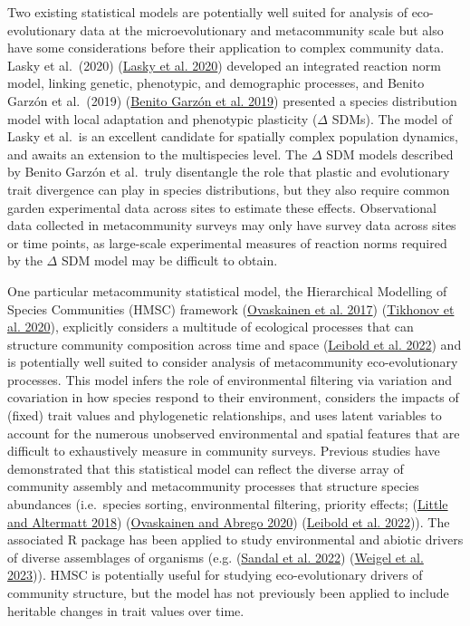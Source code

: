 \documentclass[
]{article}
\begin{document}
Two existing statistical models are potentially well suited for analysis of eco-evolutionary data at the microevolutionary and metacommunity scale but also have some considerations before their application to complex community data. Lasky et al.~(2020) (\protect\hyperlink{ref-Lasky2020}{Lasky et al. 2020}) developed an integrated reaction norm model, linking genetic, phenotypic, and demographic processes, and Benito Garzón et al.~(2019) (\protect\hyperlink{ref-Garzon2019}{Benito Garzón et al. 2019}) presented a species distribution model with local adaptation and phenotypic plasticity (\(\Delta\) SDMs). The model of Lasky et al.~is an excellent candidate for spatially complex population dynamics, and awaits an extension to the multispecies level. The \(\Delta\) SDM models described by Benito Garzón et al.~truly disentangle the role that plastic and evolutionary trait divergence can play in species distributions, but they also require common garden experimental data across sites to estimate these effects. Observational data collected in metacommunity surveys may only have survey data across sites or time points, as large-scale experimental measures of reaction norms required by the \(\Delta\) SDM model may be difficult to obtain.

One particular metacommunity statistical model, the Hierarchical Modelling of Species Communities (HMSC) framework (\protect\hyperlink{ref-Ovaskainen2017HMSC}{Ovaskainen et al. 2017}) (\protect\hyperlink{ref-Tikhonov2020}{Tikhonov et al. 2020}), explicitly considers a multitude of ecological processes that can structure community composition across time and space (\protect\hyperlink{ref-Leibold2022}{Leibold et al. 2022}) and is potentially well suited to consider analysis of metacommunity eco-evolutionary processes. This model infers the role of environmental filtering via variation and covariation in how species respond to their environment, considers the impacts of (fixed) trait values and phylogenetic relationships, and uses latent variables to account for the numerous unobserved environmental and spatial features that are difficult to exhaustively measure in community surveys. Previous studies have demonstrated that this statistical model can reflect the diverse array of community assembly and metacommunity processes that structure species abundances (i.e.~species sorting, environmental filtering, priority effects; (\protect\hyperlink{ref-Little2018}{Little and Altermatt 2018}) (\protect\hyperlink{ref-Ovaskainen2020}{Ovaskainen and Abrego 2020}) (\protect\hyperlink{ref-Leibold2022}{Leibold et al. 2022})). The associated R package has been applied to study environmental and abiotic drivers of diverse assemblages of organisms (e.g. (\protect\hyperlink{ref-Sandal2022}{Sandal et al. 2022}) (\protect\hyperlink{ref-Weigel2023}{Weigel et al. 2023})). HMSC is potentially useful for studying eco-evolutionary drivers of community structure, but the model has not previously been applied to include heritable changes in trait values over time.
\end{document}
